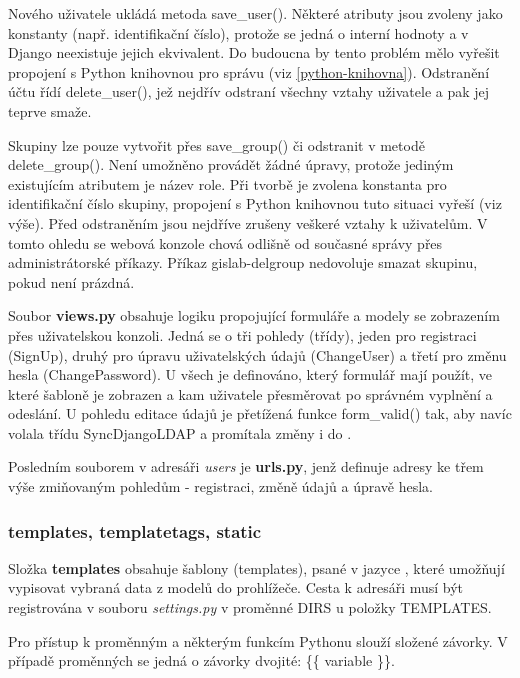Nového uživatele ukládá metoda \textsf{save\_user()}. Některé atributy
jsou zvoleny jako konstanty (např. identifikační číslo), protože se
jedná o interní hodnoty  a v Django neexistuje jejich
ekvivalent. Do budoucna by tento problém mělo vyřešit propojení s
Python knihovnou pro správu (viz \ref{python-knihovna}). Odstranění
účtu řídí \textsf{delete\_user()}, jež nejdřív odstraní všechny vztahy
uživatele a pak jej teprve smaže.

Skupiny lze pouze vytvořit přes \textsf{save\_group()} či odstranit v
metodě \textsf{delete\_group()}. Není umožněno provádět žádné úpravy,
protože jediným existujícím atributem je název role. Při tvorbě je
zvolena konstanta pro identifikační číslo skupiny, propojení s Python
knihovnou tuto situaci vyřeší (viz výše). Před odstraněním jsou
nejdříve zrušeny veškeré vztahy k uživatelům. V tomto ohledu se webová 
konzole chová odlišně od současné správy přes administrátorské příkazy. 
Příkaz \textsf{gislab-delgroup} nedovoluje smazat skupinu, pokud není 
prázdná.
 
Soubor \textbf{views.py} obsahuje logiku propojující formuláře a
modely se zobrazením přes uživatelskou konzoli. Jedná se o tři pohledy
(třídy), jeden pro registraci (\textsf{SignUp}), druhý pro úpravu
uživatelských údajů (\textsf{ChangeUser}) a třetí pro změnu hesla
(\textsf{ChangePassword}). U všech je definováno, který formulář mají
použít, ve které šabloně je zobrazen a kam uživatele přesměrovat po
správném vyplnění a odeslání. U pohledu editace údajů je přetížená
funkce \textsf{form\_valid()} tak, aby navíc volala třídu
\textsf{SyncDjangoLDAP} a promítala změny i do .

Posledním souborem v adresáři \textit{users} je \textbf{urls.py}, jenž
definuje  adresy ke třem výše zmiňovaným pohledům -
registraci, změně údajů a úpravě hesla.

\subsubsection{templates, templatetags, static}
Složka \textbf{templates} obsahuje šablony (templates), psané v jazyce
, které umožňují vypisovat vybraná data z modelů do
prohlížeče. Cesta k adresáři musí být registrována v souboru
\textit{settings.py} v proměnné \textsf{DIRS} u položky
\textsf{TEMPLATES}.

Pro přístup k proměnným a některým funkcím Pythonu slouží složené
závorky. V případě proměnných se jedná o závorky dvojité: \textsf{\{\{
  variable \}\}}.

